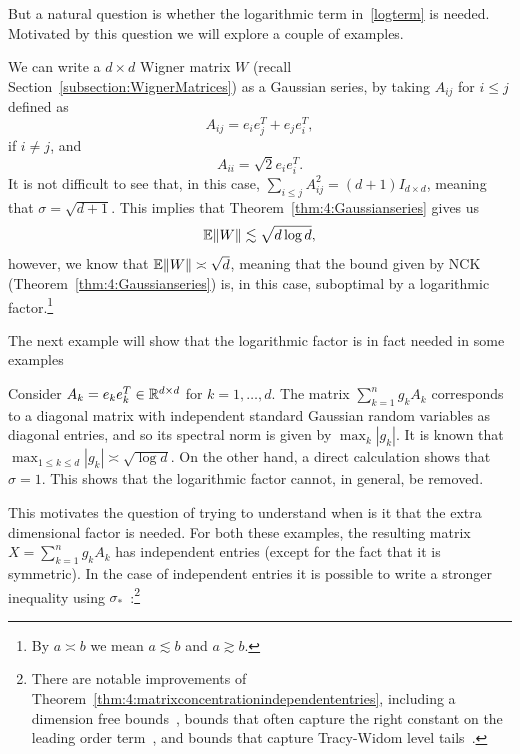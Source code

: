 But a natural question is whether the logarithmic term in~\eqref{logterm} is needed. Motivated by this question we will explore a couple of examples.

\begin{example}\label{example:WignerMatrix}
 We can write a $d\times d$ Wigner matrix $W$ (recall Section~\ref{subsection:WignerMatrices}) as a Gaussian series, by taking $A_{ij}$ for $i\leq j$ defined as
 \[
  A_{ij} = e_ie_j^T + e_je_i^T,
 \]
if $i\neq j$, and
\[
 A_{ii} = \sqrt{2} e_ie_i^T.
\]
It is not difficult to see that, in this case, $\sum_{i\leq j}A_{ij}^2 = (d+1)I_{d\times d}$, meaning that $\sigma = \sqrt{d+1}$. This implies that Theorem~\ref{thm:4:Gaussianseries} gives us
\[
 \mathbb{E}\|W\| \lesssim \sqrt{d\log d},
\]
however, we know that $ \mathbb{E}\|W\| \asymp \sqrt{d}$, meaning that the bound given by NCK (Theorem~\ref{thm:4:Gaussianseries}) is, in this case, suboptimal by a logarithmic factor.\footnote{By $a\asymp b$ we mean $a\lesssim b$ and $a \gtrsim b$.}
\end{example}

The next example will show that the logarithmic factor is in fact needed in some examples

\begin{example}
 Consider $A_k = e_ke_k^T\in\mathbb{R}^{d\times d}$ for $k=1,\dots,d$. The matrix $ \sum_{k=1}^{n} g_k A_k$ corresponds to a diagonal matrix with independent standard Gaussian random variables as diagonal entries, and so its spectral norm is given by $\max_k |g_k|$. It is known that $\max_{1\leq k \leq d} |g_k| \asymp \sqrt{\log d}$. On the other hand, a direct calculation shows that $\sigma = 1$. This shows that the logarithmic factor cannot, in general, be removed.
\end{example}

This motivates the question of trying to understand when is it that the extra dimensional factor is needed. For both these examples, the resulting matrix $X = \sum_{k=1}^{n} g_k A_k$ has independent entries (except for the fact that it is symmetric). In the case of independent entries it is possible to write a stronger inequality using $\sigma_\ast$~\cite{Bandeira_NARandomMatrixBound}:\footnote{There are notable improvements of Theorem~\ref{thm:4:matrixconcentrationindependententries}, including a dimension free bounds~\cite{latala2018dimension}, bounds that often capture the right constant on the leading order term~\cite{Bandeiraetal_FreeProbability}, and bounds that capture Tracy-Widom level tails~\cite{vanHandel-Brailovskaya-indentries2024}.}

